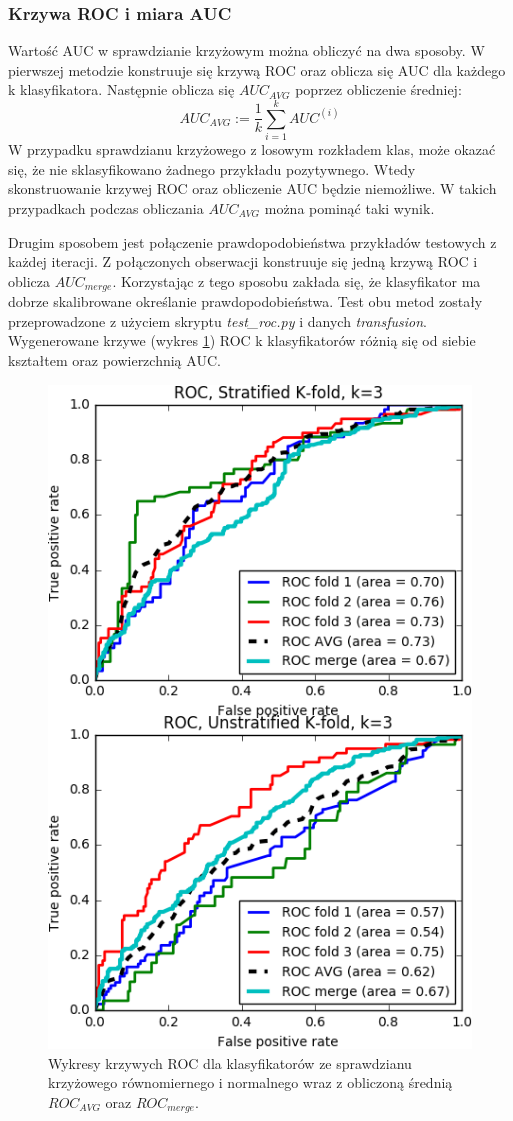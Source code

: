 \subsubsection{Krzywa ROC i miara AUC}
Wartość AUC w sprawdzianie krzyżowym można obliczyć na dwa sposoby. W pierwszej metodzie konstruuje się krzywą ROC oraz oblicza się AUC dla każdego k klasyfikatora. Następnie oblicza się $AUC_{AVG}$ poprzez obliczenie średniej:
\[AUC_{AVG} := \frac{1}{k} \sum_{i=1}^{k} AUC^{(i)} \]
W przypadku sprawdzianu krzyżowego z losowym rozkładem klas, może okazać się, że nie sklasyfikowano żadnego przykładu pozytywnego. Wtedy skonstruowanie krzywej ROC oraz obliczenie AUC będzie niemożliwe. W takich przypadkach podczas obliczania $AUC_{AVG}$ można pominąć taki wynik. \par
Drugim sposobem jest połączenie prawdopodobieństwa przykładów testowych z każdej iteracji. Z połączonych obserwacji konstruuje się jedną krzywą ROC i oblicza $AUC_{merge}$. Korzystając z tego sposobu zakłada się, że klasyfikator ma dobrze skalibrowane określanie prawdopodobieństwa.  Test obu metod zostały przeprowadzone z użyciem skryptu \textit{test\_roc.py} i danych \textit{transfusion}. Wygenerowane krzywe (wykres \ref{fig:cv_roc}) ROC k klasyfikatorów różnią się od siebie kształtem oraz powierzchnią AUC. 
\begin{figure}[H]
	\centering
	\includegraphics{./images/CV_ROC.png}
	\caption[Wykres krzywej ROC dla różnego sprawdzianu krzyżowego]{Wykresy krzywych ROC dla klasyfikatorów ze sprawdzianu krzyżowego równomiernego i normalnego wraz z obliczoną średnią $ROC_{AVG}$ oraz $ROC_{merge}$.}
	\label{fig:cv_roc}
\end{figure}
